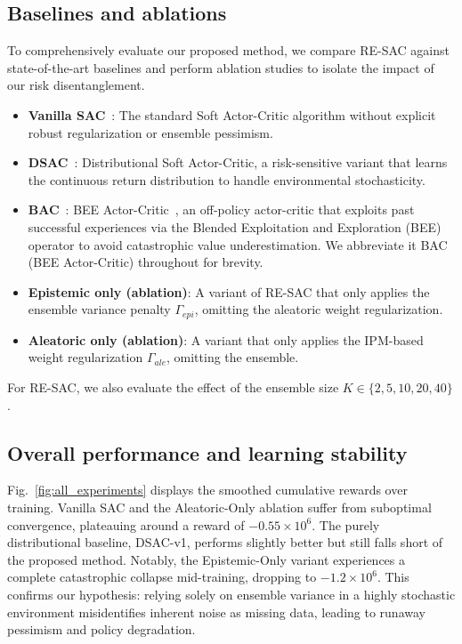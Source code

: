 \documentclass[10pt]{article}
\begin{document}
\subsection{Baselines and ablations}
To comprehensively evaluate our proposed method, we compare RE-SAC against state-of-the-art baselines and perform ablation studies to isolate the impact of our risk disentanglement.
\begin{itemize}
    \item \textbf{Vanilla SAC}~\cite{Haarnoja2018SAC}: The standard Soft Actor-Critic algorithm without explicit robust regularization or ensemble pessimism.
    \item \textbf{DSAC}~\cite{Ma2025DSAC}: Distributional Soft Actor-Critic, a risk-sensitive variant that learns the continuous return distribution to handle environmental stochasticity.
    \item \textbf{BAC}~\cite{Ji2024SeizingSerendipity}: BEE Actor-Critic~\cite{Ji2024SeizingSerendipity}, an off-policy actor-critic that exploits past successful experiences via the Blended Exploitation and Exploration (BEE) operator to avoid catastrophic value underestimation. We abbreviate it BAC (BEE Actor-Critic) throughout for brevity.
    \item \textbf{Epistemic only (ablation)}: A variant of RE-SAC that only applies the ensemble variance penalty $\Gamma_{epi}$, omitting the aleatoric weight regularization.
    \item \textbf{Aleatoric only (ablation)}: A variant that only applies the IPM-based weight regularization $\Gamma_{ale}$, omitting the ensemble.
\end{itemize}
For RE-SAC, we also evaluate the effect of the ensemble size $K \in \{2, 5, 10, 20, 40\}$.

\subsection{Overall performance and learning stability}
Fig.~\ref{fig:all_experiments} displays the smoothed cumulative rewards over training. Vanilla SAC and the Aleatoric-Only ablation suffer from suboptimal convergence, plateauing around a reward of $-0.55 \times 10^6$. The purely distributional baseline, DSAC-v1, performs slightly better but still falls short of the proposed method. Notably, the Epistemic-Only variant experiences a complete catastrophic collapse mid-training, dropping to $-1.2 \times 10^6$. This confirms our hypothesis: relying solely on ensemble variance in a highly stochastic environment misidentifies inherent noise as missing data, leading to runaway pessimism and policy degradation.
\end{document}
